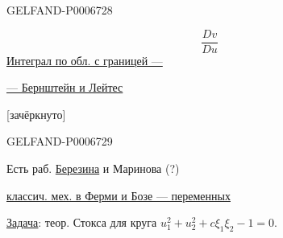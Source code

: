 \begin{GelfandAdjacentEvidence}{GELFAND-P000672}{8}

\[
\frac{Dv}{Du}
\]
\underline{Интеграл по обл. с границей ---}

\underline{--- Бернштейн и Лейтес}

[зачёркнуто]
\end{GelfandAdjacentEvidence}
\begin{GelfandAdjacentEvidence}{GELFAND-P000672}{9}


Есть раб. \underline{Березина} и Маринова (?)
\end{GelfandAdjacentEvidence}


\underline{классич. мех. в Ферми и Бозе --- переменных}

\underline{\underline{Задача}}: теор. Стокса для круга \(u_1^2+u_2^2+c\xi_1\xi_2-1=0\).


